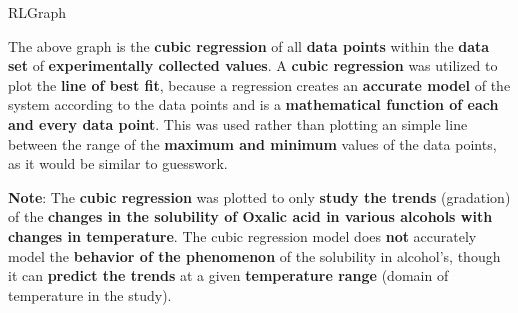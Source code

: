             





{RLGraph}

{The above graph is the \textbf{cubic regression} of all \textbf{data points} within the \textbf{data set} of \textbf{experimentally collected values}. A \textbf{cubic regression} was utilized to plot the \textbf{line of best fit}, because a regression creates an \textbf{accurate model} of the system according to the data points and is a \textbf{mathematical function of each and every data point}. This was used rather than plotting an simple line between the range of the \textbf{maximum and minimum} values of the data points, as it would be similar to guesswork.}

{\textbf{Note}: The \textbf{cubic regression} was plotted to only \textbf{study the trends} (gradation) of the \textbf{changes in the solubility of Oxalic acid in various alcohols with changes in temperature}. The cubic regression model does \textbf{not} accurately model the \textbf{behavior of the phenomenon} of the solubility in alcohol's, though it can \textbf{predict the trends} at a given \textbf{temperature range} (domain of temperature in the study).}

